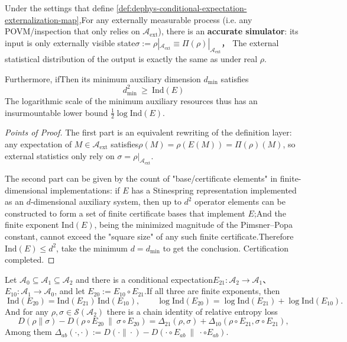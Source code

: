 \begin{proposition}\label{prop:dephys-operator-zk-simulation-index-lower-bound}Under the settings that define \ref{def:dephys-conditional-expectation-externalization-map},For any externally measurable process (i.e. any POVM/inspection that only relies on \(\mathcal{A}_{\mathrm{ext}}\)), there is an \textbf {accurate simulator}: its input is only externally visible state\(
\sigma:=\rho|_{\mathcal{A}_{\mathrm{ext}}}\equiv \Pi(\rho)|_{\mathcal{A}_{\mathrm{ext}}}
\)，
The external statistical distribution of the output is exactly the same as under real \(\rho\).\par
Furthermore, ifThen its minimum auxiliary dimension \(d_{\min}\) satisfies\[
\boxed{\;d_{\min}^2\ \ge\ \mathrm{Ind}(E)\;}
\]
The logarithmic scale of the minimum auxiliary resources thus has an insurmountable lower bound \(\tfrac12\log\mathrm{Ind}(E)\).\end{proposition}
\begin{proof}[Points of Proof]The first part is an equivalent rewriting of the definition layer: any expectation of \(M\in\mathcal{A}_{\mathrm{ext}}\) satisfies\(
\rho(M)=\rho(E(M))=\Pi(\rho)(M)
\), so external statistics only rely on \(\sigma=\rho|_{\mathcal{A}_{\mathrm{ext}}}\).\par
The second part can be given by the count of "base/certificate elements" in finite-dimensional implementations: if \(E\) has a Stinespring representation implemented as an \(d\)-dimensional auxiliary system, then up to \(d^2\) operator elements can be constructed to form a set of finite certificate bases that implement \(E\);And the finite exponent \(\mathrm{Ind}(E)\), being the minimized magnitude of the Pimsner--Popa constant, cannot exceed the "square size" of any such finite certificate.Therefore \(\mathrm{Ind}(E)\le d^2\), take the minimum \(d=d_{\min}\) to get the conclusion. Certification completed.\end{proof}



\begin{corollary}\label{cor:dephys-index-chain-rule}Let \(\mathcal{A}_0\subseteq \mathcal{A}_1\subseteq \mathcal{A}_2\) and there is a conditional expectation\(
E_{21}:\mathcal{A}_2\to\mathcal{A}_1
\)、\(
E_{10}:\mathcal{A}_1\to\mathcal{A}_0
\), and let \(E_{20}:=E_{10}\circ E_{21}\).If all three are finite exponents, then\[
\boxed{\;
\mathrm{Ind}(E_{20})=\mathrm{Ind}(E_{21})\,\mathrm{Ind}(E_{10}),\qquad
\log\mathrm{Ind}(E_{20})=\log\mathrm{Ind}(E_{21})+\log\mathrm{Ind}(E_{10}).\;}
\]
And for any \(\rho,\sigma\in\mathcal{S}(\mathcal{A}_2)\) there is a chain identity of relative entropy loss\[
\boxed{\;
D(\rho\|\sigma)-D(\rho\circ E_{20}\ \|\ \sigma\circ E_{20})
=\Delta_{21}(\rho,\sigma)+\Delta_{10}(\rho\circ E_{21},\sigma\circ E_{21}),\;}
\]
Among them \(\Delta_{ab}(\cdot,\cdot):=D(\cdot\|\cdot)-D(\cdot\circ E_{ab}\ \|\ \cdot\circ E_{ab})\).\end{corollary}

